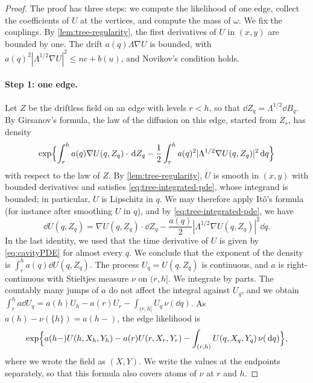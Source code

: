 \begin{proof}
The proof has three steps: we compute the likelihood of one edge, collect
the coefficients of $U$ at the vertices, and compute the mass of
$\omega$. We fix the couplings. By \cref{lem:tree-regularity}, the first
derivatives of $U$ in $(x,y)$ are bounded by one. The drift
$a(q)\Lambda\nabla U$ is bounded, with
$a(q)^2|\Lambda^{1/2}\nabla U|^2\le nc+b(u)$, and Novikov's condition
holds.

\paragraph{Step 1: one edge.}
Let $Z$ be the driftless field on an edge with levels $r<h$, so that
$\dd Z_q=\Lambda^{1/2}\dd B_q$. By Girsanov's formula, the law of the
diffusion on this edge, started from $Z_r$, has density
\[
 \exp\Bigl\{\int_r^ha(q)\nabla U(q,Z_q)\cdot\,\mathrm d Z_q
   -\frac12\int_r^ha(q)^2|\Lambda^{1/2}\nabla U(q,Z_q)|^2\,\mathrm d q\Bigr\}
\]
with respect to the law of $Z$. By \cref{lem:tree-regularity}, $U$ is
smooth in $(x,y)$ with bounded derivatives and satisfies
\eqref{eq:tree-integrated-pde}, whose integrand is bounded; in
particular, $U$ is Lipschitz in $q$. We may therefore apply Itô's formula
(for instance after smoothing $U$ in $q$), and by
\eqref{eq:tree-integrated-pde}, we have
\[
 \dd U(q,Z_q)=\nabla U(q,Z_q)\cdot\dd Z_q
       -\frac{a(q)}2|\Lambda^{1/2}\nabla U(q,Z_q)|^2\dd q.
\]
In the last identity, we used that the time derivative of $U$ is given by
\eqref{eq:cavityPDE} for almost every $q$. We conclude that the exponent of the density is
$\int_r^ha(q)\dd U(q,Z_q)$. The process $U_q=U(q,Z_q)$ is continuous,
and $a$ is right-continuous with Stieltjes measure $\nu$ on $(r,h]$. We
integrate by parts. The countably many jumps of $a$ do not affect the
integral against $U_q$, and we obtain
$\int_r^ha\dd U_q=a(h)U_h-a(r)U_r-\int_{(r,h]}U_q\,\nu(\dd q)$. As
$a(h)-\nu(\{h\})=a(h-)$, the edge likelihood is
\begin{equation}\label{eq:cav-edge-likelihood}
 \exp\Bigl\{a(h-)U(h,X_h,Y_h)-a(r)U(r,X_r,Y_r)
                    -\int_{(r,h)}U(q,X_q,Y_q)\,\nu(\,\mathrm d q)\Bigr\},
\end{equation}
where we wrote the field as $(X,Y)$. We write the values at the endpoints
separately, so that this formula also covers atoms of $\nu$ at $r$ and
$h$.


\end{proof}
